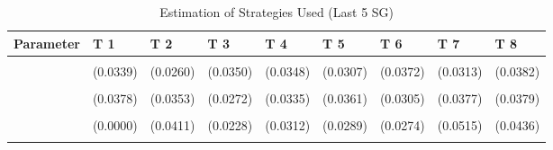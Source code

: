 \begin{table}[!h]
\centering
\caption{Estimation of Strategies Used (Last 5 SG)}
\centering
\begin{tabular}[t]{lllllllll}
\toprule
Parameter & T 1 & T 2 & T 3 & T 4 & T 5 & T 6 & T 7 & T 8\\
\midrule
\cellcolor{gray!10}{gamma} & \cellcolor{gray!10}{0.6153***} & \cellcolor{gray!10}{0.5310***} & \cellcolor{gray!10}{0.5881***} & \cellcolor{gray!10}{0.6328***} & \cellcolor{gray!10}{0.6273***} & \cellcolor{gray!10}{0.6642***} & \cellcolor{gray!10}{0.6444***} & \cellcolor{gray!10}{0.6975***}\\
 & (0.0339) & (0.0260) & (0.0350) & (0.0348) & (0.0307) & (0.0372) & (0.0313) & (0.0382)\\
\cellcolor{gray!10}{AD} & \cellcolor{gray!10}{0.4779***} & \cellcolor{gray!10}{0.3525***} & \cellcolor{gray!10}{0.8052***} & \cellcolor{gray!10}{0.7045***} & \cellcolor{gray!10}{0.7605***} & \cellcolor{gray!10}{0.7616***} & \cellcolor{gray!10}{0.3698***} & \cellcolor{gray!10}{0.4045***}\\
 & (0.0378) & (0.0353) & (0.0272) & (0.0335) & (0.0361) & (0.0305) & (0.0377) & (0.0379)\\
\cellcolor{gray!10}{AC} & \cellcolor{gray!10}{0.0000} & \cellcolor{gray!10}{0.0572} & \cellcolor{gray!10}{0.1245***} & \cellcolor{gray!10}{0.1962***} & \cellcolor{gray!10}{0.1182***} & \cellcolor{gray!10}{0.1363***} & \cellcolor{gray!10}{0.2627***} & \cellcolor{gray!10}{0.1478***}\\
\addlinespace
 & (0.0000) & (0.0411) & (0.0228) & (0.0312) & (0.0289) & (0.0274) & (0.0515) & (0.0436)\\
\cellcolor{gray!10}{G} & \cellcolor{gray!10}{0.5221***} & \cellcolor{gray!10}{0.5903***} & \cellcolor{gray!10}{0.0703**} & \cellcolor{gray!10}{0.0993***} & \cellcolor{gray!10}{0.1213***} & \cellcolor{gray!10}{0.1021***} & \cellcolor{gray!10}{0.3675***} & \cellcolor{gray!10}{0.4478***}\\
\bottomrule
\end{tabular}
\end{table}